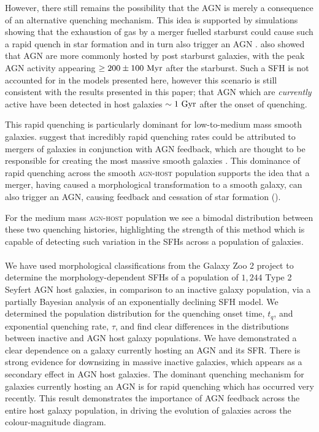 \documentclass[useAMS,usenatbib]{mn2e}
\def\changed    {\color{nc} }
\def\secondchange    {\color{srv} }
\begin{document}
{\changed However, there still remains the possibility that the AGN is merely a consequence of an alternative quenching mechanism. This idea is supported by simulations showing that the exhaustion of gas by a merger fuelled starburst could cause such a rapid quench in star formation and in turn also trigger an AGN \citep{Croton06, Wild09, Snyder11, Hayward14}. \citet{Yesuf14} also showed that AGN are more commonly hosted by post starburst galaxies, with the peak AGN activity appearing $\geq 200 \pm 100 ~\rm{Myr}$ after the starburst. Such a SFH is not accounted for in the models presented here, however this scenario is still consistent with the results presented in this paper; that AGN which are \emph{currently} active have been detected in host galaxies $\sim 1~\rm{Gyr}$ after the onset of quenching.}


This rapid quenching is particularly dominant for low-to-medium mass smooth galaxies. \cite{Sme2015} suggest that incredibly rapid quenching rates could be attributed to mergers of galaxies in conjunction with AGN feedback, which are thought to be responsible for creating the most massive smooth galaxies \citep{Con03, SdMH05, Hopkins08}. This dominance of rapid quenching across the smooth \textsc{agn-host} population supports the idea that a merger, having caused a morphological transformation to a smooth galaxy, can also trigger an AGN, causing feedback and cessation of star formation (\citealt{Sanders88}).


For the medium mass \textsc{agn-host} population we see a bimodal distribution between these two quenching histories, highlighting the strength of this method which is capable of detecting such variation in the SFHs across a population of galaxies. 
\\
\\
We have used morphological classifications from the Galaxy Zoo 2 project to determine the morphology-dependent SFHs of a population of $1,244$ Type 2 Seyfert AGN host galaxies, in comparison to an inactive galaxy population, via a {\secondchange partially} Bayesian analysis of an exponentially declining SFH model. We determined the {\secondchange population distribution} for the quenching onset time, $t_q$, and exponential quenching rate, $\tau$, and find clear differences in the {\secondchange distributions} between inactive and AGN host galaxy populations. We have demonstrated a clear dependence on a galaxy currently hosting an AGN and its SFR. There is strong evidence for downsizing in massive inactive galaxies, which appears as a secondary effect in AGN host galaxies. The dominant quenching mechanism for galaxies currently hosting an AGN is for rapid quenching which has occurred very recently. This result demonstrates the importance of AGN feedback across the entire host galaxy population, in driving the evolution of galaxies across the colour-magnitude diagram.  
\end{document}

